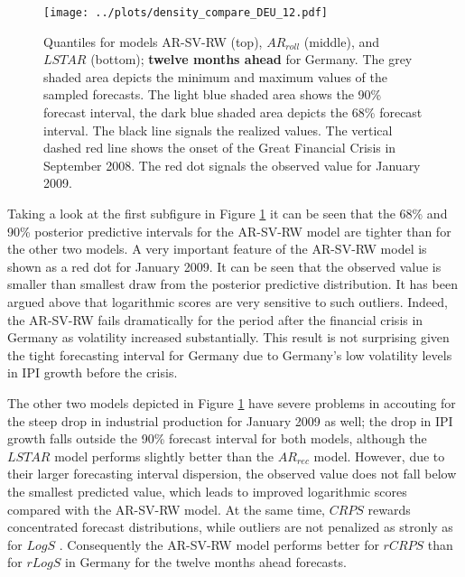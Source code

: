 \documentclass[12pt,letterpaper,fleqn]{article}           %
\begin{document}
\begin{figure}
\captionsetup{singlelinecheck=false, justification=justified}
\centering \texttt{[image: ../plots/density\_compare\_DEU\_12.pdf]} 
\caption{Quantiles for models AR-SV-RW (top), $AR_{roll}$ (middle), and $LSTAR$ (bottom); \textbf{twelve months ahead} for Germany. The grey shaded area depicts the minimum and maximum values of the sampled forecasts. The light blue shaded area shows the 90\% forecast interval, the dark blue shaded area depicts the 68\% forecast interval. The black line signals the realized values. The vertical dashed red line shows the onset of the Great Financial Crisis in September 2008. The red dot signals the observed value for January 2009.}
\label{fig:deu_dens} 
\end{figure}

Taking a look at the first subfigure in Figure \ref{fig:deu_dens} it can be seen that the 68\% and 90\% posterior predictive intervals for the AR-SV-RW model are tighter than for the other two models. %
A very important feature of the AR-SV-RW model is shown as a red dot for January 2009. It can be seen that the observed value is smaller than smallest draw from the posterior predictive distribution. It has been argued above that logarithmic scores are very sensitive to such outliers. Indeed, the AR-SV-RW fails dramatically for the period after the financial crisis in Germany as volatility increased substantially. This result is not surprising given the tight forecasting interval for Germany due to Germany's low volatility levels in IPI growth before the crisis. 

The other two models depicted in Figure \ref{fig:deu_dens} have severe problems in accouting for the steep drop in industrial production for January 2009 as well; the drop in IPI growth falls outside the 90\% forecast interval for both models, although the $LSTAR$ model performs slightly better than the $AR_{rec}$ model. However, due to their larger forecasting interval dispersion, the observed value does not fall below the smallest predicted value, which leads to improved logarithmic scores compared with the AR-SV-RW model. At the same time, $CRPS$ rewards concentrated forecast distributions, while outliers are not penalized as stronly as for $LogS$ \parencite{krueger19}. Consequently the AR-SV-RW model performs better for $rCRPS$ than for $rLogS$ in Germany for the twelve months ahead forecasts.
\end{document}

